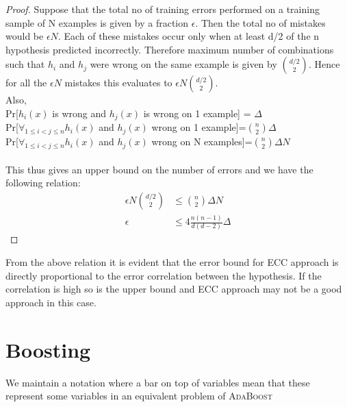 \documentclass[11pt]{article}
\begin{document}
     \begin{proof}
        Suppose that the total no of training errors performed on a training sample of N examples is given by a fraction $\epsilon$. Then the total no of mistakes would be $\epsilon N$. Each of these mistakes occur only when at least d/2 of the n hypothesis predicted incorrectly. Therefore maximum number of combinations such that $h_i$ and $h_j$ were wrong on the same example is given by $d/2 \choose 2$. Hence for all the $\epsilon N$ mistakes this evaluates to $\epsilon N {d/2 \choose 2}$.\\
        Also,\\
        Pr[$h_i(x)$ is wrong and $h_j(x)$ is wrong on 1 example] = $\Delta$\\
        Pr[$\forall_{1\leq i < j \leq n} h_i(x)$ and $h_j(x)$ wrong on 1 example]=${n \choose 2} \Delta$\\
        Pr[$\forall_{1\leq i < j \leq n} h_i(x)$ and $h_j(x)$ wrong on N examples]=${n \choose 2} \Delta N$\\\\
        This thus gives an upper bound on the number of errors and we have the following relation:
        \begin{align*}
            \epsilon N {d/2 \choose 2} &\leq {n \choose 2} \Delta N\\
            \epsilon &\leq 4\frac{n(n-1)}{d(d-2)}\Delta
        \end{align*}
    \end{proof}
    From the above relation it is evident that the error bound for ECC approach is directly proportional to the error correlation between the hypothesis. If the correlation is high so is the upper bound and ECC approach may not be a good approach in this case.
\normalfont
    
\section{Boosting}
We maintain a notation where a bar on top of variables mean that these represent some variables in an equivalent problem of \textsc{AdaBoost}
\end{document}
